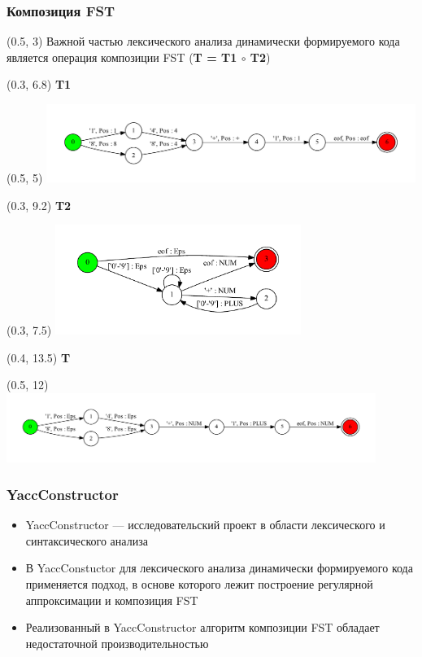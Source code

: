 \documentclass{beamer}
\begin{document}
\begin{frame}
  \transwipe[direction=90]
  \frametitle{Композиция FST}
  \begin{textblock}{12}(0.5, 3)
    Важной частью лексического анализа динамически формируемого
    кода является операция композиции FST (\textbf{T = T1 $\circ$ T2})
  \end{textblock}
  \begin{textblock}{12}(0.3, 6.8)
    \textbf{T1}
  \end{textblock}
  \begin{textblock}{12}(0.5, 5)
    \includegraphics[width=12cm]{pictures/example_.pdf}
  \end{textblock}
  \begin{textblock}{12}(0.3, 9.2)
    \textbf{T2}
  \end{textblock}
  \begin{textblock}{8}(0.3, 7.5)
    \includegraphics[width=8cm]{pictures/lexer_.pdf}
  \end{textblock}
  \begin{textblock}{12}(0.4, 13.5)
    \textbf{T}
  \end{textblock}
  \begin{textblock}{12}(0.5, 12)
    \includegraphics[width=12cm]{pictures/res_.pdf}
  \end{textblock}
\end{frame}

\begin{frame}
  \transwipe[direction=90]
  \frametitle{YaccConstructor}
  \begin{itemize}
    \item YaccConstructor — исследовательский проект в области 
    лексического и синтаксического анализа
    \item В YaccConstuctor для лексического анализа динамически формируемого кода
    применяется подход, в основе которого лежит построение  регулярной аппроксимации и 
    композиция FST
    \item Реализованный в YaccConstructor алгоритм композиции FST обладает недостаточной
    производительностью
  \end{itemize}
\end{frame}
\end{document}
